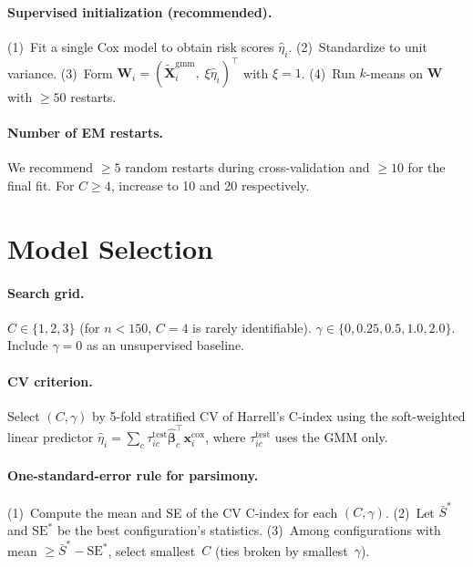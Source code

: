 \documentclass[11pt]{article}
\newcommand{\bx}{\mathbf{x}}
\newcommand{\bX}{\mathbf{X}}
\newcommand{\bW}{\mathbf{W}}
\newcommand{\bbeta}{\boldsymbol{\beta}}
\newenvironment{revblock}{\color{revcolor}}{}
\begin{document}
\paragraph{Supervised initialization (recommended).}
(1)~Fit a single Cox model to obtain risk scores $\hat{\eta}_i$. (2)~Standardize to unit variance. (3)~Form $\bW_i = (\tilde{\bX}_i^{\mathrm{gmm}},\;\xi\hat{\eta}_i)^\top$ with $\xi\!=\!1$. (4)~Run $k$-means on $\bW$ with ${\ge}50$ restarts.

\begin{revblock}
\paragraph{Number of EM restarts.}
We recommend ${\ge}5$ random restarts during cross-validation and ${\ge}10$ for the final fit. For $C\ge 4$, increase to 10 and 20 respectively.
\end{revblock}


\section{Model Selection}\label{sec:model-sel}

\begin{revblock}
\paragraph{Search grid.}
$C \in \{1, 2, 3\}$ (for $n<150$, $C\!=\!4$ is rarely identifiable). $\gamma \in \{0, 0.25, 0.5, 1.0, 2.0\}$. Include $\gamma\!=\!0$ as an unsupervised baseline.
\end{revblock}

\paragraph{CV criterion.}
Select $(C,\gamma)$ by 5-fold stratified CV of Harrell's C-index using the soft-weighted linear predictor $\hat{\eta}_i = \sum_c \tau_{ic}^{\mathrm{test}}\hat{\bbeta}_c^\top\bx_i^{\mathrm{cox}}$, where $\tau_{ic}^{\mathrm{test}}$ uses the GMM only.

\begin{revblock}
\paragraph{One-standard-error rule for parsimony.}\label{sec:1se}
(1)~Compute the mean and SE of the CV C-index for each $(C,\gamma)$. (2)~Let $\bar{S}^*$ and $\mathrm{SE}^*$ be the best configuration's statistics. (3)~Among configurations with mean ${\ge}\bar{S}^* - \mathrm{SE}^*$, select smallest~$C$ (ties broken by smallest~$\gamma$).
\end{revblock}
\end{document}

